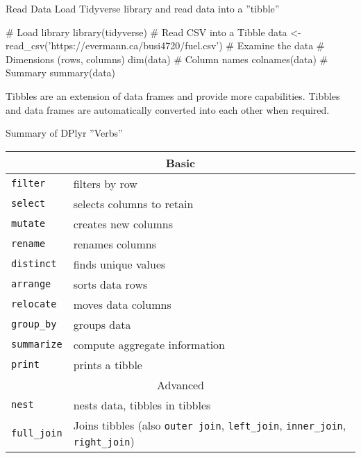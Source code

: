 \documentclass[ignorenonframetext,xcolor=x11names]{beamer}
\begin{document}
\begin{frame}[fragile]{Read Data}
Load Tidyverse library and read data into a ''tibble''

\begin{Rcode}
# Load library
library(tidyverse)
# Read CSV into a Tibble
data <- read_csv('https://evermann.ca/busi4720/fuel.csv')
# Examine the data
# Dimensions (rows, columns)
dim(data)
# Column names
colnames(data)
# Summary
summary(data)
\end{Rcode}

Tibbles are an extension of data frames and provide more capabilities. Tibbles and data frames are automatically converted into each other when required.
\end{frame}


\begin{frame}{Summary of DPlyr ''Verbs''}

\footnotesize
\centering
\renewcommand{\arraystretch}{1.25}

\begin{tabularx}{\textwidth}{l|X} \hline
\multicolumn{2}{c}{Basic} \\ \hline
\texttt{filter} & filters by row \\
\texttt{select} & selects columns to retain \\
\texttt{mutate} & creates new columns \\
\texttt{rename} & renames columns \\
\texttt{distinct} & finds unique values \\
\texttt{arrange} & sorts data rows \\
\texttt{relocate} & moves data columns \\
\texttt{group\_by} & groups data \\
\texttt{summarize} & compute aggregate information \\
\texttt{print} & prints a tibble \\  \hline
\multicolumn{2}{c}{Advanced} \\ \hline
\texttt{nest} & nests data, tibbles in tibbles \\
\texttt{full\_join} & Joins tibbles (also \texttt{outer join}, \texttt{left\_join}, \texttt{inner\_join}, \texttt{right\_join}) \\ \hline
\end{tabularx}

\end{frame}
\end{document}
